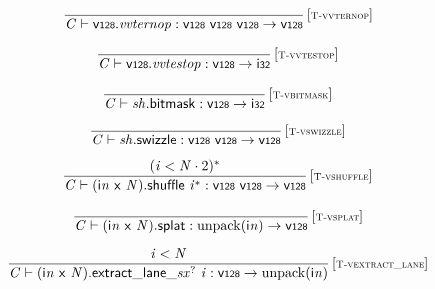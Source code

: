 $$
\begin{array}{@{}c@{}}\displaystyle
\frac{
}{
{\mathit{C}} \vdash \mathsf{v{\scriptstyle128}} . {\mathit{vvternop}} : \mathsf{v{\scriptstyle128}}~\mathsf{v{\scriptstyle128}}~\mathsf{v{\scriptstyle128}} \rightarrow \mathsf{v{\scriptstyle128}}
} \, {[\textsc{\scriptsize T{-}vvternop}]}
\qquad
\end{array}
$$

$$
\begin{array}{@{}c@{}}\displaystyle
\frac{
}{
{\mathit{C}} \vdash \mathsf{v{\scriptstyle128}} . {\mathit{vvtestop}} : \mathsf{v{\scriptstyle128}} \rightarrow \mathsf{i{\scriptstyle32}}
} \, {[\textsc{\scriptsize T{-}vvtestop}]}
\qquad
\end{array}
$$

$$
\begin{array}{@{}c@{}}\displaystyle
\frac{
}{
{\mathit{C}} \vdash {\mathit{sh}}.\mathsf{bitmask} : \mathsf{v{\scriptstyle128}} \rightarrow \mathsf{i{\scriptstyle32}}
} \, {[\textsc{\scriptsize T{-}vbitmask}]}
\qquad
\end{array}
$$

$$
\begin{array}{@{}c@{}}\displaystyle
\frac{
}{
{\mathit{C}} \vdash {\mathit{sh}}.\mathsf{swizzle} : \mathsf{v{\scriptstyle128}}~\mathsf{v{\scriptstyle128}} \rightarrow \mathsf{v{\scriptstyle128}}
} \, {[\textsc{\scriptsize T{-}vswizzle}]}
\qquad
\end{array}
$$

$$
\begin{array}{@{}c@{}}\displaystyle
\frac{
({\mathit{i}} < {\mathit{N}} \cdot 2)^\ast
}{
{\mathit{C}} \vdash ({\mathsf{i}}{{\mathit{n}}}~\mathsf{x}~{\mathit{N}}).\mathsf{shuffle}~{{\mathit{i}}^\ast} : \mathsf{v{\scriptstyle128}}~\mathsf{v{\scriptstyle128}} \rightarrow \mathsf{v{\scriptstyle128}}
} \, {[\textsc{\scriptsize T{-}vshuffle}]}
\qquad
\end{array}
$$

$$
\begin{array}{@{}c@{}}\displaystyle
\frac{
}{
{\mathit{C}} \vdash ({\mathsf{i}}{{\mathit{n}}}~\mathsf{x}~{\mathit{N}}).\mathsf{splat} : {\mathrm{unpack}}({\mathsf{i}}{{\mathit{n}}}) \rightarrow \mathsf{v{\scriptstyle128}}
} \, {[\textsc{\scriptsize T{-}vsplat}]}
\qquad
\end{array}
$$

$$
\begin{array}{@{}c@{}}\displaystyle
\frac{
{\mathit{i}} < {\mathit{N}}
}{
{\mathit{C}} \vdash {({\mathsf{i}}{{\mathit{n}}}~\mathsf{x}~{\mathit{N}}).\mathsf{extract\_lane\_}}{{{\mathit{sx}}^?}}~{\mathit{i}} : \mathsf{v{\scriptstyle128}} \rightarrow {\mathrm{unpack}}({\mathsf{i}}{{\mathit{n}}})
} \, {[\textsc{\scriptsize T{-}vextract\_lane}]}
\qquad
\end{array}
$$

